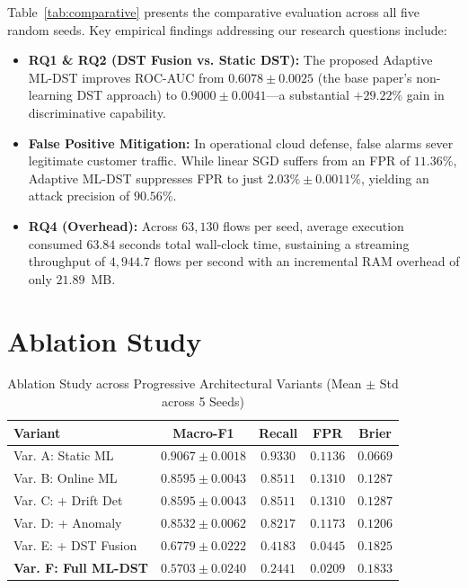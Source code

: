 \documentclass[conference]{IEEEtran}
\begin{document}
Table~\ref{tab:comparative} presents the comparative evaluation across all five random seeds.
Key empirical findings addressing our research questions include:
\begin{itemize}
    \item \textbf{RQ1 \& RQ2 (DST Fusion vs. Static DST):} The proposed Adaptive ML-DST improves ROC-AUC from $0.6078 \pm 0.0025$ (the base paper's non-learning DST approach) to $0.9000 \pm 0.0041$---a substantial $+29.22\%$ gain in discriminative capability.
    \item \textbf{False Positive Mitigation:} In operational cloud defense, false alarms sever legitimate customer traffic. While linear SGD suffers from an FPR of $11.36\%$, Adaptive ML-DST suppresses FPR to just $2.03\% \pm 0.0011\%$, yielding an attack precision of $90.56\%$.
    \item \textbf{RQ4 (Overhead):} Across $63,130$ flows per seed, average execution consumed $63.84$ seconds total wall-clock time, sustaining a streaming throughput of $4,944.7$ flows per second with an incremental RAM overhead of only $21.89$~MB.
\end{itemize}

\section{Ablation Study}
\begin{table}[t]
\centering
\caption{Ablation Study across Progressive Architectural Variants (Mean $\pm$ Std across 5 Seeds)}
\label{tab:ablation}
\begin{tabular}{lcccc}
\toprule
\textbf{Variant} & \textbf{Macro-F1} & \textbf{Recall} & \textbf{FPR} & \textbf{Brier} \\
\midrule
Var. A: Static ML & $0.9067 \pm 0.0018$ & $0.9330$ & $0.1136$ & $0.0669$ \\
Var. B: Online ML & $0.8595 \pm 0.0043$ & $0.8511$ & $0.1310$ & $0.1287$ \\
Var. C: + Drift Det & $0.8595 \pm 0.0043$ & $0.8511$ & $0.1310$ & $0.1287$ \\
Var. D: + Anomaly & $0.8532 \pm 0.0062$ & $0.8217$ & $0.1173$ & $0.1206$ \\
Var. E: + DST Fusion & $0.6779 \pm 0.0222$ & $0.4183$ & $0.0445$ & $0.1825$ \\
\textbf{Var. F: Full ML-DST} & $\mathbf{0.5703 \pm 0.0240}$ & $\mathbf{0.2441}$ & $\mathbf{0.0209}$ & $\mathbf{0.1833}$ \\
\bottomrule
\end{tabular}
\end{table}
\end{document}
